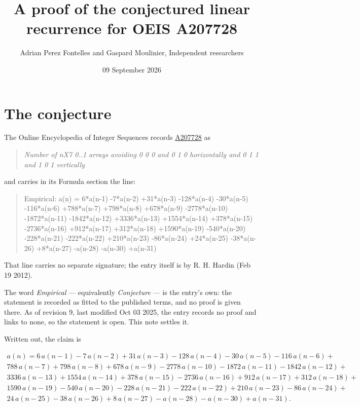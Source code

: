 \documentclass[11pt]{article}
\title{A proof of the conjectured linear recurrence for OEIS A207728}
\author{Adrian Perez Fontelles and Gaspard Moulinier, Independent researchers}
\date{09 September 2026}
\theoremstyle{definition}
\begin{document}
\maketitle
\section{The conjecture}

The Online Encyclopedia of Integer Sequences records \href{https://oeis.org/A207728}{A207728} as

\begin{quote}\itshape Number of nX7 0..1 arrays avoiding 0 0 0 and 0 1 0 horizontally and 0 1 1 and 1 0 1 vertically\end{quote}

and carries in its Formula section the line:

\begin{quote}\ttfamily Empirical: a(n) = 6*a(n-1) -7*a(n-2) +31*a(n-3) -128*a(n-4) -30*a(n-5) -116*a(n-6) +788*a(n-7) +798*a(n-8) +678*a(n-9) -2778*a(n-10) -1872*a(n-11) -1842*a(n-12) +3336*a(n-13) +1554*a(n-14) +378*a(n-15) -2736*a(n-16) +912*a(n-17) +312*a(n-18) +1590*a(n-19) -540*a(n-20) -228*a(n-21) -222*a(n-22) +210*a(n-23) -86*a(n-24) +24*a(n-25) -38*a(n-26) +8*a(n-27) -a(n-28) -a(n-30) +a(n-31)\end{quote}

That line carries no separate signature; the entry itself is by R. H. Hardin (Feb 19 2012).

The word {\itshape Empirical} --- equivalently {\itshape Conjecture} --- is the entry's own: the statement is recorded as fitted to the published terms, and no proof is given there. As of revision 9, last modified Oct 03 2025, the entry records no proof and links to none, so the statement is open. This note settles it.

Written out, the claim is

\begin{multline*} a(n) = 6\,a(n-1) - 7\,a(n-2) + 31\,a(n-3) - 128\,a(n-4) - 30\,a(n-5) - 116\,a(n-6) + \\ 788\,a(n-7) + 798\,a(n-8) + 678\,a(n-9) - 2778\,a(n-10) - 1872\,a(n-11) - 1842\,a(n-12) + \\ 3336\,a(n-13) + 1554\,a(n-14) + 378\,a(n-15) - 2736\,a(n-16) + 912\,a(n-17) + 312\,a(n-18) + \\ 1590\,a(n-19) - 540\,a(n-20) - 228\,a(n-21) - 222\,a(n-22) + 210\,a(n-23) - 86\,a(n-24) + \\ 24\,a(n-25) - 38\,a(n-26) + 8\,a(n-27) - a(n-28) - a(n-30) + a(n-31). \end{multline*}
\end{document}

